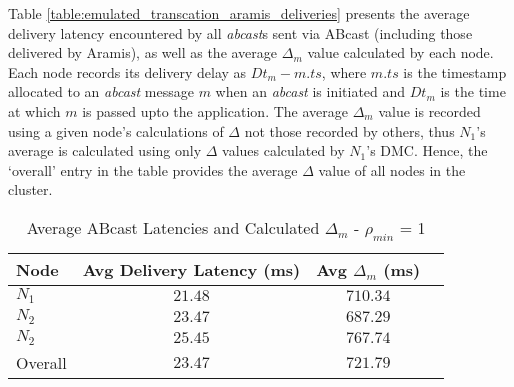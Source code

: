     Table \ref{table:emulated_transcation_aramis_deliveries} presents the average delivery latency encountered by all \emph{abcast}s sent via \textsf{ABcast} (including those delivered by \textsf{Aramis}), as well as the average $\Delta_m$ value calculated by each node.  Each node records its delivery delay as $Dt_m - m.ts$, where $m.ts$ is the timestamp allocated to an \emph{abcast} message $m$ when an \emph{abcast} is initiated and $Dt_m$ is the time at which $m$ is passed upto the application.  The average $\Delta_m$ value is recorded using a given node's calculations of $\Delta$ not those recorded by others, thus $N_1$'s average is calculated using only $\Delta$ values calculated by $N_1$'s DMC.  Hence, the \textquoteleft{}overall' entry in the table provides the average $\Delta$ value of all nodes in the cluster.  
    
\begin{table}[p]
  \begin{center}
  \renewcommand{\arraystretch}{1.3}
   \begin{tabular}{|l|c|c|c|}
    \hline
    Node      & Avg Delivery Latency (ms) & Avg $\Delta_m$ (ms) \\ \hline \hline
    $N_1$   & $21.48$                           & $710.34$                   \\ \hline
    $N_2$   & $23.47$                           & $687.29$                  \\ \hline
    $N_2$   & $25.45$                           & $767.74$                   \\ \hline \hline
    Overall   & $23.47$                           & $721.79$                 \\ \hline
    \end{tabular}
    \caption{Average \textsf{ABcast} Latencies and Calculated $\Delta_m$ - $\rho_{min}$ = 1}
    \label{table:infinite_clients_aramis_latencies}
  \end{center}
\end{table}       

